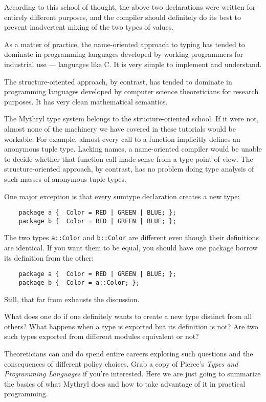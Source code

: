 According to this school of thought, the above two declarations 
were written for entirely different purposes, and the compiler 
should definitely do its best to prevent inadvertent mixing of 
the two types of values.

As a matter of practice, the name-oriented approach to typing has 
tended to dominate in programming languages developed by 
working programmers for industrial use --- languages like C.  It 
is very simple to implement and understand.

The structure-oriented approach, by contrast, has tended to dominate 
in programming languages developed by computer science theoreticians 
for research purposes.  It has very clean mathematical semantics.

The Mythryl type system belongs to the structure-oriented school. 
If it were not, almost none of the machinery we have covered in 
these tutorials would be workable.  For example, almost every call to 
a function implicitly defines an anonymous tuple type.  Lacking 
names, a name-oriented compiler would be unable to decide whether 
that function call made sense from a type point of view.  The 
structure-oriented approach, by contrast, has no problem doing 
type analysis of such masses of anonymous tuple types.

One major exception is that every sumtype declaration creates a 
new type:

\begin{verbatim}
    package a {  Color = RED | GREEN | BLUE; };
    package b {  Color = RED | GREEN | BLUE; };
\end{verbatim}

The two types {\tt a::Color} and {\tt b::Color} are different even 
though their definitions are identical.  If you want them to be 
equal, you should have one package borrow its definition from the other:

\begin{verbatim}
    package a {  Color = RED | GREEN | BLUE; };
    package b {  Color = a::Color; };
\end{verbatim}

Still, that far from exhausts the discussion.

What does one do if one definitely wants to create a new type distinct 
from all others?  What happens when a type is exported but its 
definition is not?  Are two such types exported from different modules 
equivalent or not?

Theoreticians can and do spend entire careers exploring such questions 
and the consequences of different policy choices.  Grab a copy of 
Pierce's {\it Types and Programming Languages} if you're interested. 
Here we are just going to summarize the basics of what Mythryl does 
and how to take advantage of it in practical programming.

